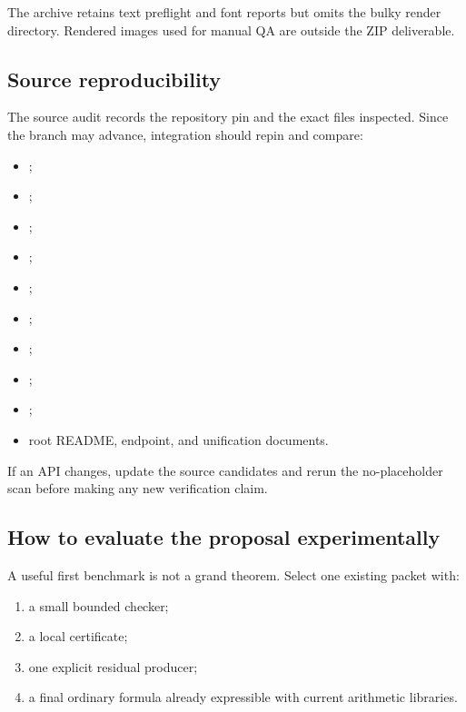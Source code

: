 The archive retains text preflight and font reports but omits the bulky render directory.  Rendered
images used for manual QA are outside the ZIP deliverable.

\subsection{Source reproducibility}

The source audit records the repository pin and the exact files inspected.  Since the branch may
advance, integration should repin and compare:

\begin{itemize}
\item {};
\item {};
\item {};
\item {};
\item {};
\item {};
\item {};
\item {};
\item {};
\item root README, endpoint, and unification documents.
\end{itemize}

If an API changes, update the source candidates and rerun the no-placeholder scan before making any
new verification claim.

\subsection{How to evaluate the proposal experimentally}

A useful first benchmark is not a grand theorem.  Select one existing packet with:

\begin{enumerate}
\item a small bounded checker;
\item a local certificate;
\item one explicit residual producer;
\item a final ordinary formula already expressible with current arithmetic libraries.
\end{enumerate}

